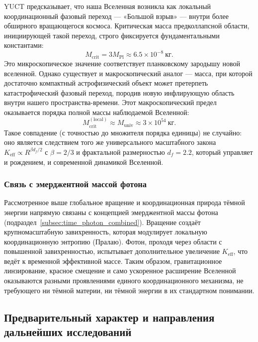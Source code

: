 \documentclass[12pt,a4paper]{article}
\begin{document}
YUCT предсказывает, что наша Вселенная возникла как локальный координационный фазовый переход — «Большой взрыв» — внутри более обширного вращающегося космоса. Критическая масса предколлапсной области, инициирующей такой переход, строго фиксируется фундаментальными константами:
\begin{equation}
	M_{\mathrm{crit}} = 3 M_{\mathrm{Pl}} \approx 6.5 \times 10^{-8}\ \text{кг}.
	\label{eq:Mcrit_micro_combined}
\end{equation}
Это микроскопическое значение соответствует планковскому зародышу новой вселенной. Однако существует и макроскопический аналог — масса, при которой достаточно компактный астрофизический объект может претерпеть катастрофический фазовый переход, породив новую инфлирующую область внутри нашего пространства-времени. Этот макроскопический предел оказывается порядка полной массы наблюдаемой Вселенной:
\begin{equation}
	M_{\mathrm{crit}}^{\mathrm{(local)}} \approx M_{\mathrm{univ}} \approx 3 \times 10^{54}\ \text{кг}.
	\label{eq:Mcrit_macro_combined}
\end{equation}
Такое совпадение (с точностью до множителя порядка единицы) не случайно: оно является следствием того же универсального масштабного закона $K_{\mathrm{eff}} \propto R^{\beta d_f/2}$ с $\beta=2/3$ и фрактальной размерностью $d_f=2.2$, который управляет и рождением, и современной динамикой Вселенной.

\subsubsection{Связь с эмерджентной массой фотона}

Рассмотренное выше глобальное вращение и координационная природа тёмной энергии напрямую связаны с концепцией эмерджентной массы фотона (подраздел~\ref{subsec:time_photon_combined}). Вращение создаёт крупномасштабную завихренность, которая модулирует локальную координационную энтропию (Пралаю). Фотон, проходя через области с повышенной завихренностью, испытывает дополнительное увеличение $K_{\mathrm{eff}}$, что ведёт к временной эффективной массе. Таким образом, гравитационное линзирование, красное смещение и само ускоренное расширение Вселенной оказываются разными проявлениями единого координационного механизма, не требующего ни тёмной материи, ни тёмной энергии в их стандартном понимании.

\subsection{Предварительный характер и направления дальнейших исследований}
\end{document}
